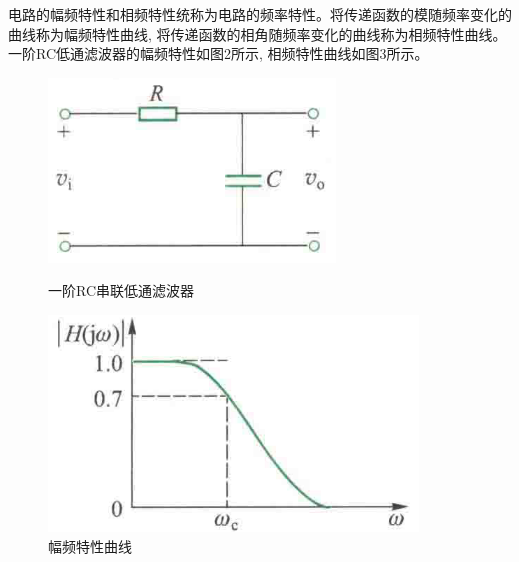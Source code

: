 \documentclass[10pt, a4paper]{article} %
\begin{document}
电路的幅频特性和相频特性统称为电路的频率特性。将传递函数的模随频率变化的曲线称为幅频特性曲线, 将传递函数的相角随频率变化的曲线称为相频特性曲线。一阶RC低通滤波器的幅频特性如图2所示, 相频特性曲线如图3所示。

\newpage

\begin{figure}[ht]
    \centering
    \begin{minipage}[ht]{0.3\textwidth}
        \centering
        \includegraphics[width=\linewidth]{image/1.png}
        \caption{一阶RC串联低通滤波器}
        \label{fig:side:a}
    \end{minipage}
    \hfill
    \begin{minipage}[ht]{0.3\textwidth}
        \centering
        \includegraphics[width=\linewidth]{image/2.png}
        \caption{幅频特性曲线}
        \label{fig:side:b}
    \end{minipage}
    \hfill
    \begin{minipage}[ht]{0.3\textwidth}
        \centering

\end{minipage}
\end{figure}
\end{document}
